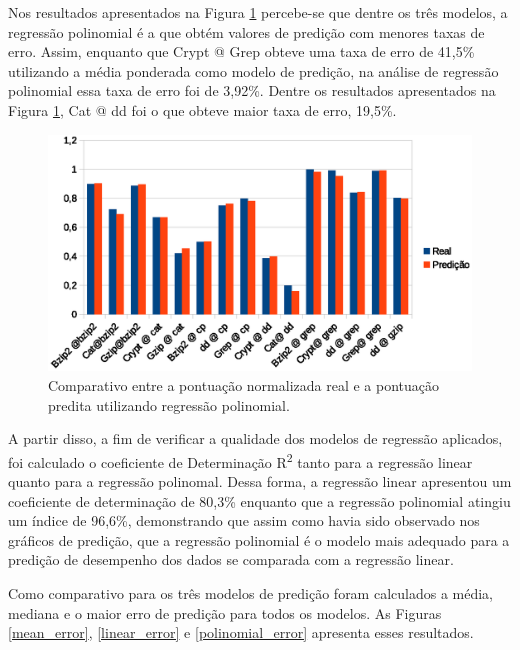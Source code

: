 Nos resultados apresentados na Figura \ref{poli_predict} percebe-se que dentre os três modelos, a regressão polinomial é a que obtém valores de predição com menores taxas de erro. Assim, enquanto que Crypt @ Grep obteve uma taxa de erro de 41,5\% utilizando a média ponderada como modelo de predição, na análise de regressão polinomial essa taxa de erro foi de 3,92\%. Dentre os resultados apresentados na Figura \ref{poli_predict}, Cat @ dd foi o que obteve maior taxa de erro, 19,5\%. 

\begin{figure}[!htb]
\centering
\includegraphics [keepaspectratio=true,scale=0.8]{graficos/poli.eps}
\caption{Comparativo entre a pontuação normalizada real e a pontuação predita utilizando regressão polinomial.}
\label{poli_predict}
\end{figure}  

A partir disso, a fim de verificar a qualidade dos modelos de regressão aplicados, foi calculado o coeficiente de Determinação R\textsuperscript{2} tanto para a regressão linear quanto para a regressão polinomal. Dessa forma, a regressão linear apresentou um coeficiente de determinação de 80,3\% enquanto que a regressão polinomial atingiu um índice de 96,6\%, demonstrando que assim como havia sido observado nos gráficos de predição, que a regressão polinomial é o modelo mais adequado para a predição de desempenho dos dados se comparada com a regressão linear.   

Como comparativo para os três modelos de predição foram calculados a média, mediana e o maior erro de predição para todos os modelos. As Figuras \ref{mean_error}, \ref{linear_error} e \ref{polinomial_error} apresenta esses resultados.

